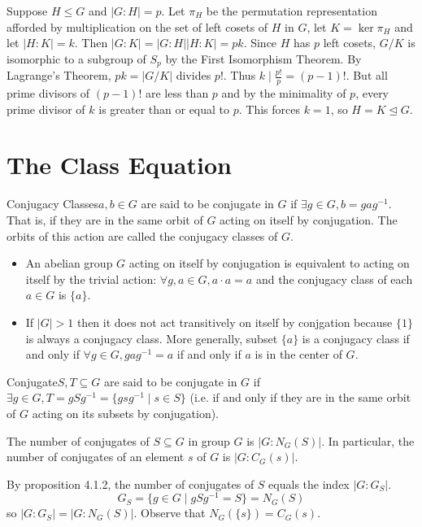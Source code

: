 \documentclass{report}
\newcommand{\mprop}[2]{\begin{Prop}{#1}{}#2\end{Prop}}
\newcommand{\ex}[2]{\begin{Example}{#1}{}#2\end{Example}}
\newcommand{\dfn}[2]{\begin{Definition}[colbacktitle=red!75!black]{#1}{}#2\end{Definition}}
\newenvironment{myproof}[1][\proofname]{%
	\proof[\bfseries #1: ]%
}{\endproof}
\begin{document}
\begin{myproof}
    Suppose $H \leq G$ and $|G:H| = p$. Let $\pi_H$ be the permutation representation afforded by multiplication on the set of left cosets of $H$ in $G$, let $K = \ker \pi_H$ and let $|H:K| = k$. Then $|G:K|=|G:H||H:K| = pk$. Since $H$ has $p$ left cosets, $G/K$ is isomorphic to a subgroup of $S_p$ by the First Isomorphism Theorem. By Lagrange's Theorem, $pk = |G/K|$ divides $p!$. Thus $k \mid \frac{p!}{p} = (p-1)!$. But all prime divisors of $(p-1)!$ are less than $p$ and by the minimality of $p$, every prime divisor of $k$ is greater than or equal to $p$. This forces $k = 1$, so $H = K \unlhd G$. 
\end{myproof}

\section{The Class Equation}
\dfn{Conjugacy Classes}{$a, b \in G$ are said to be conjugate in $G$ if $\exists g \in G, b = gag^{-1}$. That is, if they are in the same orbit of $G$ acting on itself by conjugation. The orbits of this action are called the conjugacy classes of $G$. }
\ex{}{\begin{itemize}
    \item An abelian group $G$ acting on itself by conjugation is equivalent to acting on itself by the trivial action: $\forall g , a \in G, a \cdot a = a$ and the conjugacy class of each $a \in G$ is $\{ a\}$. 
    \item If $|G|> 1$ then it does not act transitively on itself by conjgation because $\{1\}$ is always a conjugacy class. More generally, subset $\{a \}$ is a conjugacy class if and only if $\forall g \in G, gag^{-1} = a$ if and only if $a$ is in the center of $G$. 
\end{itemize}}
\dfn{Conjugate}{$S, T \subseteq G$ are said to be conjugate in $G$ if $\exists g \in G, T = gSg^{-1} = \{gsg^{-1} \mid s \in S \}$ (i.e. if and only if they are in the same orbit of $G$ acting on its subsets by conjugation).}
\mprop{}{The number of conjugates of $S \subseteq G$ in group $G$ is $|G:N_G (S)|$. In particular, the number of conjugates of an element $s$ of $G$ is $|G:C_G (s)|$.}
\begin{myproof}
    By proposition 4.1.2, the number of conjugates of $S$ equals the index $|G:G_S|$. 
    $$G_S = \{g \in G \mid gSg^{-1} = S \} = N_G(S)$$
    so $|G:G_S| = |G:N_G(S)|$. Observe that $N_G(\{s\}) = C_G(s)$. 
\end{myproof}
\end{document}
